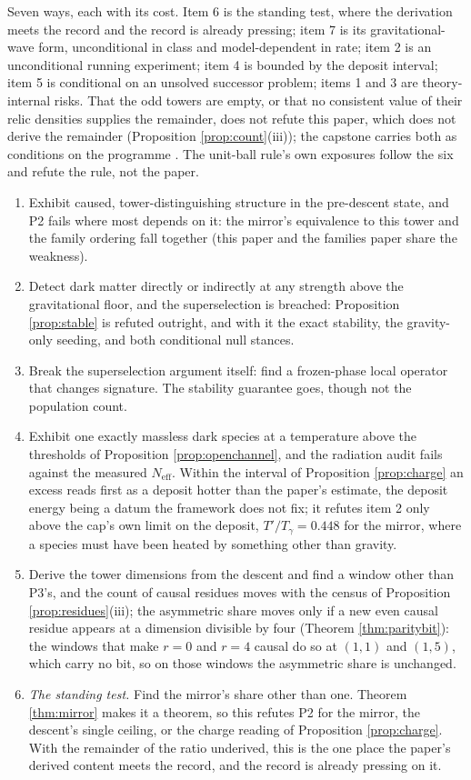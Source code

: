 \documentclass[11pt]{article}
\theoremstyle{definition}
\newcommand{\Neff}{N_{\mathrm{eff}}}
\begin{document}
Seven ways, each with its cost. Item 6 is the standing test, where the derivation meets the record and the record is already pressing; item 7 is its gravitational-wave form, unconditional in class and model-dependent in rate; item 2 is an unconditional running experiment; item 4 is bounded by the deposit interval; item 5 is conditional on an unsolved successor problem; items 1 and 3 are theory-internal risks. That the odd towers are empty, or that no consistent value of their relic densities supplies the remainder, does not refute this paper, which does not derive the remainder (Proposition \ref{prop:count}(iii)); the capstone carries both as conditions on the programme \cite{ButlerT17}. The unit-ball rule's own exposures follow the six and refute the rule, not the paper.
\begin{enumerate}
\item Exhibit caused, tower-distinguishing structure in the pre-descent state, and P2 fails where most depends on it: the mirror's equivalence to this tower and the family ordering fall together (this paper and the families paper share the weakness).
\item Detect dark matter directly or indirectly at any strength above the gravitational floor, and the superselection is breached: Proposition \ref{prop:stable} is refuted outright, and with it the exact stability, the gravity-only seeding, and both conditional null stances.
\item Break the superselection argument itself: find a frozen-phase local operator that changes signature. The stability guarantee goes, though not the population count.
\item Exhibit one exactly massless dark species at a temperature above the thresholds of Proposition \ref{prop:openchannel}, and the radiation audit fails against the measured $\Neff$. Within the interval of Proposition \ref{prop:charge} an excess reads first as a deposit hotter than the paper's estimate, the deposit energy being a datum the framework does not fix; it refutes item 2 only above the cap's own limit on the deposit, $T'/T_{\gamma} = 0.448$ for the mirror, where a species must have been heated by something other than gravity.
\item Derive the tower dimensions from the descent and find a window other than P3's, and the count of causal residues moves with the census of Proposition \ref{prop:residues}(iii); the asymmetric share moves only if a new even causal residue appears at a dimension divisible by four (Theorem \ref{thm:paritybit}): the windows that make $r = 0$ and $r = 4$ causal do so at $(1,1)$ and $(1,5)$, which carry no bit, so on those windows the asymmetric share is unchanged.
\item \emph{The standing test.} Find the mirror's share other than one. Theorem \ref{thm:mirror} makes it a theorem, so this refutes P2 for the mirror, the descent's single ceiling, or the charge reading of Proposition \ref{prop:charge}. With the remainder of the ratio underived, this is the one place the paper's derived content meets the record, and the record is already pressing on it.


\end{enumerate}
\end{document}
